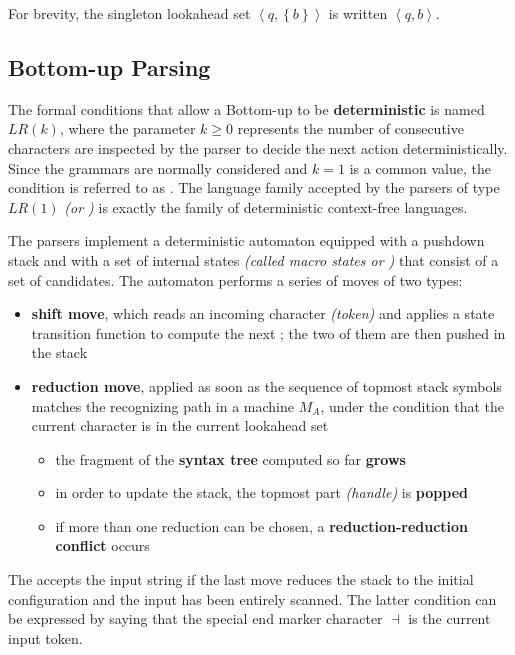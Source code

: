 \documentclass[english]{article}
\begin{document}
\bigskip
For brevity, the singleton lookahead set \(\left\langle q, \left\{ b \right\} \right\rangle\) is written \(\left\langle q, b \right\rangle\).

\subsection{Bottom-up Parsing}

The formal conditions that allow a Bottom-up to be \textbf{deterministic} is named \(\textit{LR}(k)\), where the parameter \(k \geq 0\) represents the number of consecutive characters are inspected by the parser to decide the next action deterministically.
Since the \EBNF grammars are normally considered and \(k=1\) is a common value, the condition is referred to as \elro.
The language family accepted by the parsers of type \(\textit{LR}(1)\) \textit{(or \elro)} is exactly the family \DET of deterministic context-free languages.

The \elro parsers implement a deterministic automaton equipped with a pushdown stack and with a set of internal states \textit{(called macro states or \mstates)} that consist of a set of candidates.
The automaton performs a series of moves of two types:

\begin{itemize}
  \item \textbf{shift move}, which reads an incoming character \textit{(token)} and applies a state transition function to compute the next \mstate; the two of them are then pushed in the stack
  \item \textbf{reduction move}, applied as soon as the sequence of topmost stack symbols matches the recognizing path in a machine \(M_A\), under the condition that the current character is in the current lookahead set
        \begin{itemize}[label=\(\rightarrow\)]
          \item the fragment of the \textbf{syntax tree} computed so far \textbf{grows}
          \item in order to update the stack, the topmost part \textit{(handle)} is \textbf{popped}
          \item if more than one reduction can be chosen, a \textbf{reduction-reduction conflict} occurs
        \end{itemize}
\end{itemize}

The \PDA accepts the input string if the last move reduces the stack to the initial configuration and the input has been entirely scanned.
The latter condition can be expressed by saying that the special end marker character \(\dashv\) is the current input token.
\end{document}
